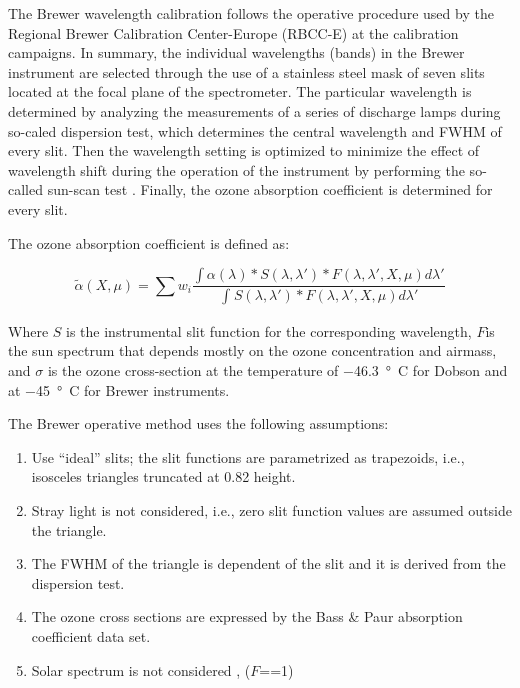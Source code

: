 \documentclass[acp]{copernicus} %
\begin{document}

The Brewer wavelength calibration follows the operative procedure \citep{Grobner1998, kerr2002new} used by the Regional Brewer Calibration Center-Europe (RBCC-E) at the calibration campaigns. In summary, the individual wavelengths (bands) in the Brewer instrument are selected through the use of a stainless steel mask of seven slits located at the focal plane of the spectrometer. The particular wavelength is determined by analyzing the measurements of  a series of discharge lamps during so-caled dispersion test, which determines the central wavelength and FWHM of every slit. Then the  wavelength setting is optimized to minimize the effect of wavelength shift during the operation of the instrument by performing the so-called sun-scan test \citep{sun_scan_ios}. Finally, the ozone absorption coefficient is determined for every slit.   


The  ozone absorption coefficient is defined as:

\begin{equation}
\widetilde \alpha (X,\mu ) = \sum {{w_i}} \frac{{\int {\alpha (\lambda )*S(\lambda ,\lambda ')*} F(\lambda ,\lambda ',X,\mu )d\lambda '}}{{\int_{}^{} {S(\lambda ,\lambda ')*F(\lambda ,\lambda ',X,\mu )d\lambda '} }}
\end{equation}

Where $S$ is the instrumental slit function for the corresponding wavelength, $F$is the sun spectrum that depends mostly on the ozone concentration and airmass, and $\sigma$ is the ozone cross-section at the temperature of $-$46.3\, \unit{\degree C} for Dobson 
and at $-$45\, \unit{\degree C} for Brewer instruments. 

The Brewer operative method uses the following assumptions:
\begin{enumerate}
	\item Use  “ideal” slits; the slit functions are parametrized as trapezoids, i.e., isosceles triangles truncated at 0.82 height.
	\item Stray light is not considered, i.e., zero slit function values are assumed outside the triangle. 
	\item The FWHM of the triangle is dependent of the slit and it is derived from the dispersion test.
	\item The ozone cross sections are expressed by the Bass \& Paur absorption coefficient data set.
 	\item Solar spectrum is not considered ,  ($F$==1)
\end{enumerate}
\end{document}
